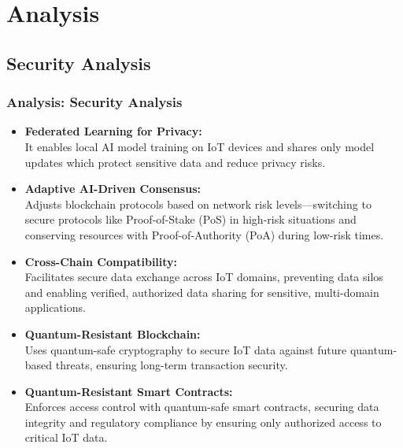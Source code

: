 \documentclass [xcolor=svgnames] {beamer}
\begin{document}
\section{Analysis}
\begin{frame}
\footnotesize
\subsection{Security Analysis}
\frametitle{Analysis: Security Analysis}

\begin{itemize}
\item \textbf{Federated Learning for Privacy: }\\
It enables local AI model training on IoT devices and shares only model updates which protect sensitive data and reduce privacy risks.

\item \textbf{Adaptive AI-Driven Consensus: }\\
Adjusts blockchain protocols based on network risk levels—switching to secure protocols like Proof-of-Stake (PoS) in high-risk situations and conserving resources with Proof-of-Authority (PoA) during low-risk times.

\item \textbf{Cross-Chain Compatibility: }\\
Facilitates secure data exchange across IoT domains, preventing data silos and enabling verified, authorized data sharing for sensitive, multi-domain applications.

\item \textbf{Quantum-Resistant Blockchain: }\\
Uses quantum-safe cryptography to secure IoT data against future quantum-based threats, ensuring long-term transaction security.

\item \textbf{Quantum-Resistant Smart Contracts: }\\
Enforces access control with quantum-safe smart contracts, securing data integrity and regulatory compliance by ensuring only authorized access to critical IoT data.
\end{itemize}

\end{frame}
\end{document}
